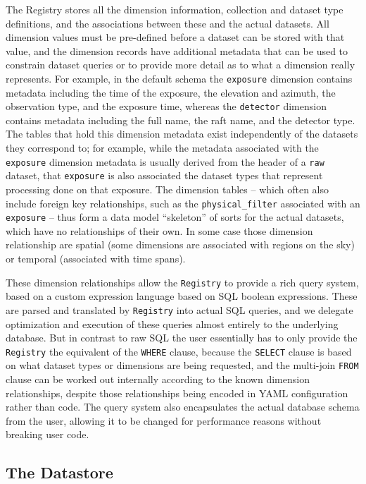 \documentclass[]{spie}
\begin{document}
The Registry stores all the dimension information, collection and dataset type definitions, and the associations between these and the actual datasets.
All dimension values must be pre-defined before a dataset can be stored with that value, and the dimension records have additional metadata that can be used to constrain dataset queries or to provide more detail as to what a dimension really represents.
For example, in the default schema the \texttt{exposure} dimension contains metadata including the time of the exposure, the elevation and azimuth, the observation type, and the exposure time, whereas the \texttt{detector} dimension contains metadata including the full name, the raft name, and the detector type.
The tables that hold this dimension metadata exist independently of the datasets they correspond to; for example, while the metadata associated with the \texttt{exposure} dimension metadata is usually derived from the header of a \texttt{raw} dataset, that \texttt{exposure} is also associated the dataset types that represent processing done on that exposure.
The dimension tables -- which often also include foreign key relationships, such as the \texttt{physical\_filter} associated with an \texttt{exposure} -- thus form a data model ``skeleton'' of sorts for the actual datasets, which have no relationships of their own.
In some case those dimension relationship are spatial (some dimensions are associated with regions on the sky) or temporal (associated with time spans).

These dimension relationships allow the \texttt{Registry} to provide a rich query system, based on a custom expression language based on SQL boolean expressions.
These are parsed and translated by \texttt{Registry} into actual SQL queries, and we delegate optimization and execution of these queries almost entirely to the underlying database.
But in contrast to raw SQL the user essentially has to only provide the \texttt{Registry} the equivalent of the \texttt{WHERE} clause, because the \texttt{SELECT} clause is based on what dataset types or dimensions are being requested, and the multi-join \texttt{FROM} clause can be worked out internally according to the known dimension relationships, despite those relationships being encoded in YAML configuration rather than code.
The query system also encapsulates the actual database schema from the user, allowing it to be changed for performance reasons without breaking user code.

\subsection{The Datastore}
\end{document}
